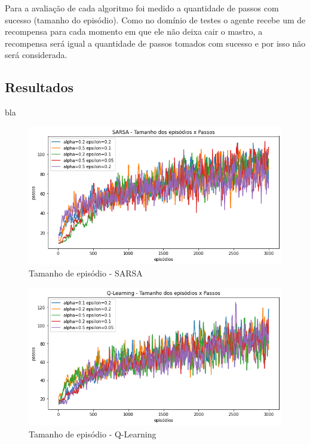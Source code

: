 \documentclass[letterpaper]{article}
\begin{document}

Para a avaliação de cada algoritmo foi medido a quantidade de passos com sucesso (tamanho do episódio). Como no domínio de testes o agente recebe um de recompensa para cada momento em que ele não deixa cair o mastro, a recompensa será igual a quantidade de passos tomados com sucesso e por isso não será considerada.

\subsection{Resultados}

bla

\begin{figure}[t]
  \centering
  \includegraphics[width=0.9\columnwidth]{exp-sarsa-episodes}
  \caption{Tamanho de episódio - SARSA}
  \label{fig:exp-sarsa-episodes}
\end{figure}

\begin{figure}[t]
  \centering
  \includegraphics[width=0.9\columnwidth]{exp-qlearning-episodes}
  \caption{Tamanho de episódio - Q-Learning}
  \label{fig:exp-qlearning-episodes}
\end{figure}
\end{document}
